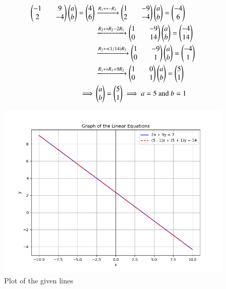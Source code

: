 \documentclass[journal]{IEEEtran}
\begin{document}
\begin{align}
    \begin{pmatrix}-1&&9\\2&&-4\end{pmatrix}\begin{pmatrix}a\\b\end{pmatrix} = \begin{pmatrix}4\\6\end{pmatrix} &\xrightarrow{R_1 \leftrightarrow -R_1} \begin{pmatrix}1&&-9\\2&&-4\end{pmatrix}\begin{pmatrix}a\\b\end{pmatrix} = \begin{pmatrix}-4\\6\end{pmatrix} \\
    &\xrightarrow{R_2 \leftrightarrow R_2 - 2R_1} \begin{pmatrix}1&&-9\\0&&14\end{pmatrix}\begin{pmatrix}a\\b\end{pmatrix} = \begin{pmatrix}-4\\14\end{pmatrix} \\
    &\xrightarrow{R_2 \leftrightarrow (1/14)R_2} \begin{pmatrix}1&&-9\\0&&1\end{pmatrix}\begin{pmatrix}a\\b\end{pmatrix} = \begin{pmatrix}-4\\1\end{pmatrix} \\
    &\xrightarrow{R_1 \leftrightarrow R_1 + 9R_2} \begin{pmatrix}1&&0\\0&&1\end{pmatrix}\begin{pmatrix}a\\b\end{pmatrix} = \begin{pmatrix}5\\1\end{pmatrix} \\
    \implies &\begin{pmatrix}a\\b\end{pmatrix} = \begin{pmatrix}5\\1\end{pmatrix} \implies a = 5 \text{ and } b = 1
\end{align}
\begin{figure}[h!]
   \centering
   \includegraphics[width=0.8\linewidth]{figs/01.png}
   \caption{Plot of the given lines}
   \label{Plot_1}
\end{figure}
\end{document}
